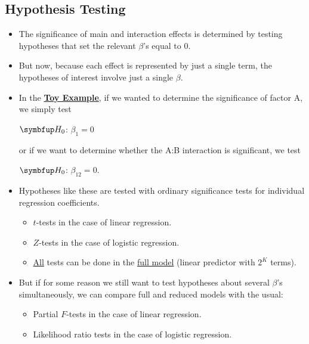 \subsection*{Hypothesis Testing}
\begin{itemize}
    \item The significance of main and interaction effects is determined by testing hypotheses that set the relevant
          $ \beta $'s equal to $ 0 $.
    \item But now, because each effect is represented by just a single term, the hypotheses of interest involve
          just a single $ \beta $.
    \item In the \hyperref[ex:toy_ex]{\textbf{Toy Example}}, if we wanted to determine the significance of factor A, we simply test
          \begin{tightcenter}
              $ \HN $: $ \beta_1=0 $
          \end{tightcenter}
          or if we want to determine whether the A:B interaction is significant, we test
          \begin{tightcenter}
              $ \HN $: $ \beta_{12}=0 $.
          \end{tightcenter}
    \item Hypotheses like these are tested with ordinary significance tests for individual regression coefficients.
          \begin{itemize}
              \item $ t $-tests in the case of linear regression.
              \item $ Z $-tests in the case of logistic regression.
          \end{itemize}
          \begin{itemize}[$\star$]
              \item \underline{All} tests can be done in the \underline{full model} (linear predictor with $ 2^K $ terms).
          \end{itemize}
    \item But if for some reason we still want to test hypotheses about several $ \beta $'s simultaneously, we can compare
          full and reduced models with the usual:
          \begin{itemize}
              \item Partial $ F $-tests in the case of linear regression.
              \item Likelihood ratio tests in the case of logistic regression.
          \end{itemize}
\end{itemize}
